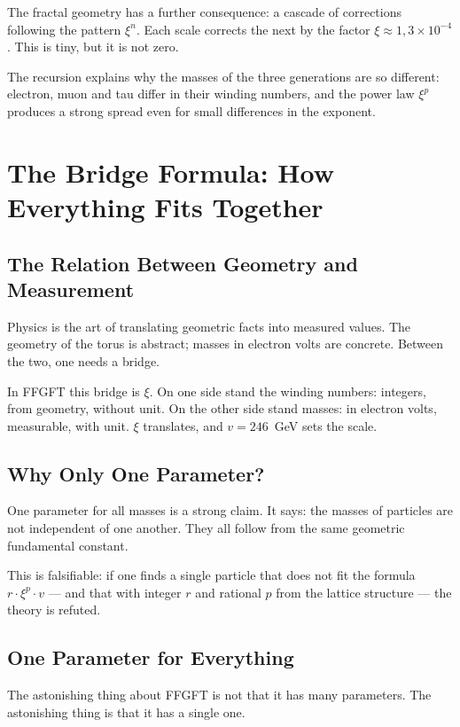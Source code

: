 \documentclass[12pt,oneside]{book}
\begin{document}
The fractal geometry has a further consequence: a cascade of corrections following the pattern $\xi^n$. Each scale corrects the next by the factor $\xi \approx 1{,}3 \times 10^{-4}$. This is tiny, but it is not zero.

The recursion explains why the masses of the three generations are so different: electron, muon and tau differ in their winding numbers, and the power law $\xi^p$ produces a strong spread even for small differences in the exponent.

\chapter{The Bridge Formula: How Everything Fits Together}

\section{The Relation Between Geometry and Measurement}

Physics is the art of translating geometric facts into measured values. The geometry of the torus is abstract; masses in electron volts are concrete. Between the two, one needs a bridge.

In FFGFT this bridge is $\xi$. On one side stand the winding numbers: integers, from geometry, without unit. On the other side stand masses: in electron volts, measurable, with unit. $\xi$ translates, and $v = 246$~GeV sets the scale.

\section{Why Only One Parameter?}

One parameter for all masses is a strong claim. It says: the masses of particles are not independent of one another. They all follow from the same geometric fundamental constant.

This is falsifiable: if one finds a single particle that does not fit the formula $r \cdot \xi^p \cdot v$ --- and that with integer $r$ and rational $p$ from the lattice structure --- the theory is refuted.

\section{One Parameter for Everything}

The astonishing thing about FFGFT is not that it has many parameters. The astonishing thing is that it has a single one.
\end{document}
